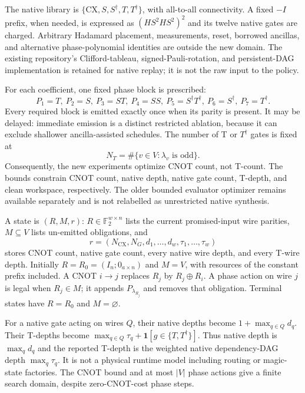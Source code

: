 \documentclass[11pt]{article}
\theoremstyle{definition}\newtheorem{definition}[theorem]{Definition}
\newcommand{\F}{\mathbb F_2}
\newcommand{\CN}{N_{\mathrm{CX}}}
\begin{document}
The native library is $\{\mathrm{CX},S,S^\dagger,T,T^\dagger\}$, with all-to-all connectivity. A fixed $-I$ prefix, when needed, is expressed as $(HS^2HS^2)^2$ and its twelve native gates are charged. Arbitrary Hadamard placement, measurements, reset, borrowed ancillas, and alternative phase-polynomial identities are outside the new domain. The existing repository's Clifford-tableau, signed-Pauli-rotation, and persistent-DAG implementation is retained for native replay; it is not the raw input to the policy.

For each coefficient, one fixed phase block is prescribed:
\begin{equation}
P_1=T,\ P_2=S,\ P_3=ST,\ P_4=SS,\ P_5=S^\dagger T^\dagger,\ P_6=S^\dagger,\ P_7=T^\dagger.
\end{equation}
Every required block is emitted exactly once when its parity is present. It may be delayed: immediate emission is a distinct restricted ablation, because it can exclude shallower ancilla-assisted schedules. The number of T or $T^\dagger$ gates is fixed at
\begin{equation}
N_T=\#\{v\in V:\lambda_v\text{ is odd}\}.
\end{equation}
Consequently, the new experiments optimize CNOT count, not T-count. The bounds constrain CNOT count, native depth, native gate count, T-depth, and clean workspace, respectively. The older bounded evaluator optimizer remains available separately and is not relabelled as unrestricted native synthesis.

A state is $(R,M,r)$: $R\in\F^{w\times n}$ lists the current promised-input wire parities, $M\subseteq V$ lists un-emitted obligations, and
\begin{equation}
r=(\CN,N_G,d_1,\ldots,d_w,\tau_1,\ldots,\tau_w)
\end{equation}
stores CNOT count, native gate count, every native wire depth, and every T-wire depth. Initially $R=R_0=(I_n;0_{a\times n})$ and $M=V$, with resources of the constant prefix included. A CNOT $i\to j$ replaces $R_j$ by $R_j\oplus R_i$. A phase action on wire $j$ is legal when $R_j\in M$; it appends $P_{\lambda_{R_j}}$ and removes that obligation. Terminal states have $R=R_0$ and $M=\varnothing$.

For a native gate acting on wires $Q$, their native depths become $1+\max_{q\in Q}d_q$. Their T-depths become $\max_{q\in Q}\tau_q+\mathbf1[g\in\{T,T^\dagger\}]$. Thus native depth is $\max_qd_q$ and the reported T-depth is the weighted native dependency-DAG depth $\max_q\tau_q$. It is not a physical runtime model including routing or magic-state factories. The CNOT bound and at most $|V|$ phase actions give a finite search domain, despite zero-CNOT-cost phase steps.
\end{document}
